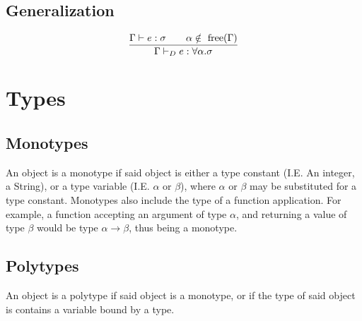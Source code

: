 \documentclass{article}
\begin{document}
\subsection{Generalization}
\begin{equation}
	\frac
		{\Gamma \vdash e : \sigma \qquad \alpha \notin \textup{ free}(\Gamma)}
		{\Gamma \vdash _{D} e:\forall\alpha.\sigma}
\end{equation}
\hfill \break

\section{Types}
\subsection{Monotypes}
An object is a monotype if said object is either a type constant (I.E. An integer, a String), or a type variable (I.E. $\alpha$ or $\beta$), where $\alpha$ or $\beta$ may be substituted for a type constant. Monotypes also include the type of a function application. For example, a function accepting an argument of type $\alpha$, and returning a value of type $\beta$ would be type $\alpha \rightarrow \beta$, thus being a monotype.
\subsection{Polytypes}
An object is a polytype if said object is a monotype, or if the type of said object is contains a variable bound by a type.
\end{document}
